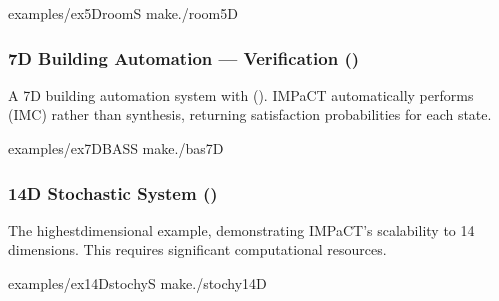 \documentclass[a4paper,10pt,english]{sphinxmanual}
\begin{document}
\sphinxAtStartPar
{}

\begin{sphinxVerbatim}[commandchars=\\\{\}]
examples/ex\PYGZus{}5Droom\PYGZhy{}S
make./room5D
\end{sphinxVerbatim}


\subsubsection{7D Building Automation — Verification ()}
\label{\detokenize{examples/safety:d-building-automation-verification-ex-7dbas-s}}
\sphinxAtStartPar
A 7D building automation system with  ().
IMPaCT automatically performs  (IMC) rather than synthesis,
returning satisfaction probabilities for each state.

\sphinxAtStartPar
{}

\begin{sphinxVerbatim}[commandchars=\\\{\}]
examples/ex\PYGZus{}7DBAS\PYGZhy{}S
make./bas7D
\end{sphinxVerbatim}


\subsubsection{14D Stochastic System ()}
\label{\detokenize{examples/safety:d-stochastic-system-ex-14dstochy-s}}
\sphinxAtStartPar
The highest\sphinxhyphen{}dimensional example, demonstrating IMPaCT’s scalability to 14
dimensions. This requires significant computational resources.

\sphinxAtStartPar
{}

\begin{sphinxVerbatim}[commandchars=\\\{\}]
examples/ex\PYGZus{}14Dstochy\PYGZhy{}S
make./stochy14D
\end{sphinxVerbatim}

\sphinxstepscope
\end{document}
